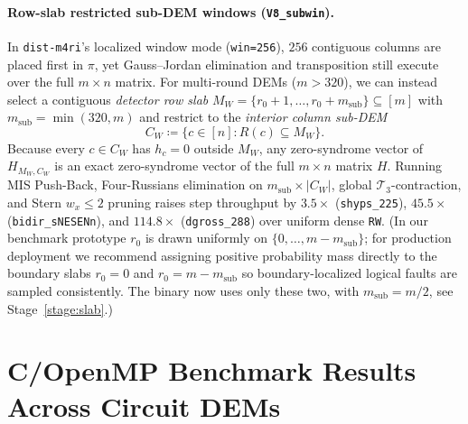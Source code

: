 \documentclass[12pt]{article}
\theoremstyle{definition}
\newcommand{\Tc}{\mathcal{T}_3}
\newcommand{\ttt}[1]{\texttt{#1}}
\begin{document}
\paragraph{Row-slab restricted sub-DEM windows (\ttt{V8\_subwin}).}
In \ttt{dist-m4ri}'s localized window mode (\ttt{win=256}), $256$ contiguous columns are placed first in $\pi$, yet
Gauss--Jordan elimination and transposition still execute over the full $m \times n$ matrix. For multi-round DEMs
($m > 320$), we can instead select a contiguous \emph{detector row slab} $M_W = \{r_0 + 1, \dots, r_0 +
m_{\mathrm{sub}}\} \subseteq [m]$ with $m_{\mathrm{sub}} = \min(320, m)$ and restrict to the \emph{interior column
sub-DEM}
\begin{equation}\label{eq:subdem}
  C_W \coloneqq \{c \in [n] : R(c) \subseteq M_W\}.
\end{equation}
Because every $c \in C_W$ has $h_c = 0$ outside $M_W$, any zero-syndrome vector of $H_{M_W, C_W}$ is an exact
zero-syndrome vector of the full $m \times n$ matrix $H$. Running MIS Push-Back, Four-Russians elimination on
$m_{\mathrm{sub}} \times |C_W|$, global $\Tc$-contraction, and Stern $w_x \le 2$ pruning raises step throughput by
$3.5\times$ (\ttt{shyps\_225}), $45.5\times$ (\ttt{bidir\_sNESENn}), and $114.8\times$ (\ttt{dgross\_288}) over
uniform dense \ttt{RW}. (In our benchmark prototype $r_0$ is drawn uniformly on $\{0, \dots, m - m_{\mathrm{sub}}\}$;
for production deployment we recommend assigning positive probability mass directly to the boundary slabs $r_0 = 0$
and $r_0 = m - m_{\mathrm{sub}}$ so boundary-localized logical faults are sampled consistently. The binary now uses
only these two, with $m_{\mathrm{sub}} = m/2$, see Stage~\ref{stage:slab}.)

\section{C/OpenMP Benchmark Results Across Circuit DEMs}\label{sec:benchmarks}
\end{document}
